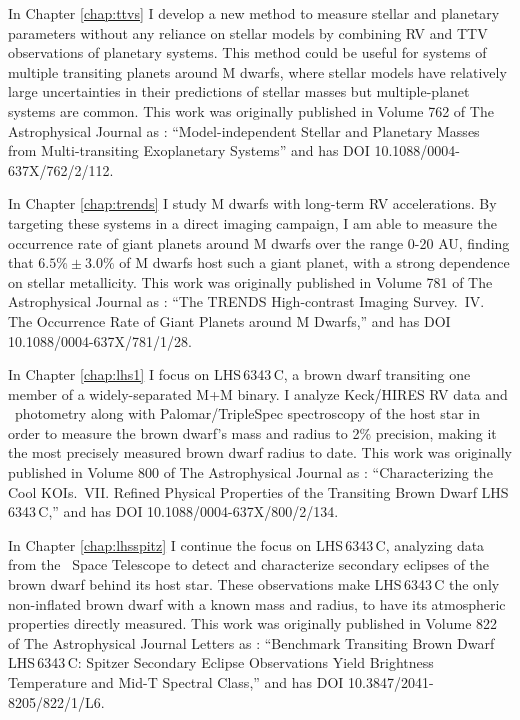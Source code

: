 In Chapter \ref{chap:ttvs} I develop a new method to measure stellar and planetary 
parameters without any reliance on stellar models by combining RV and TTV observations
of planetary systems.
This method could be useful for systems of multiple transiting planets around M dwarfs,
where stellar models have relatively large uncertainties in their predictions of stellar
masses but multiple-planet systems are common.
This work was originally published in Volume 762 of The Astrophysical Journal as \citet{Montet13}: ``Model-independent Stellar and Planetary Masses from Multi-transiting Exoplanetary Systems'' and has DOI 10.1088/0004-637X/762/2/112.

In Chapter \ref{chap:trends} I study M dwarfs with long-term RV accelerations.
By targeting these systems in a direct imaging campaign, I am able to measure the
occurrence rate of giant planets around M dwarfs over the range 0-20 AU, finding
that $6.5\% \pm 3.0\%$ of M dwarfs host such a giant planet, with a strong dependence
on stellar metallicity. This work was originally published in Volume 781 of The
Astrophysical Journal as \citet{Montet14}: ``The TRENDS High-contrast Imaging Survey.\ IV. The Occurrence Rate of Giant Planets around M Dwarfs,'' and has DOI 10.1088/0004-637X/781/1/28.

In Chapter \ref{chap:lhs1} I focus on LHS\,6343\,C, a brown dwarf transiting one member
of a widely-separated M+M binary. I analyze Keck/HIRES RV data and \kep\ photometry
along with Palomar/TripleSpec spectroscopy of the host star 
in order to measure the brown dwarf's mass and radius to 2\% precision, making it the
most precisely measured brown dwarf radius to date. This work was originally published
in Volume 800 of The Astrophysical Journal as \citet{Montet15a}: ``Characterizing the Cool KOIs.\ VII. Refined Physical Properties of the Transiting Brown Dwarf LHS\,6343\,C,''
and has DOI 10.1088/0004-637X/800/2/134.


In Chapter \ref{chap:lhsspitz} I continue the focus on LHS\,6343\,C,
analyzing data from the \spitz\ Space Telescope to detect and characterize secondary eclipses of the brown dwarf behind its host star.
These observations make LHS\,6343\,C the only non-inflated brown dwarf with a known  mass and radius, to have its atmospheric properties directly measured. 
This work was originally published in Volume 822 of The Astrophysical Journal Letters
as \citet{Montet16a}:
``Benchmark Transiting Brown Dwarf LHS\,6343\,C: Spitzer Secondary Eclipse Observations Yield Brightness Temperature and Mid-T Spectral Class,'' and has DOI
10.3847/2041-8205/822/1/L6.

